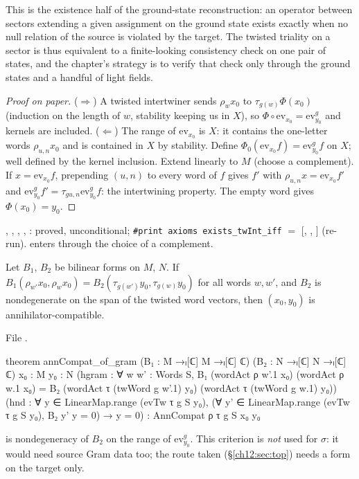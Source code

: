 \begin{physics}
This is the existence half of the ground-state reconstruction: an operator between sectors extending a given assignment on the ground state exists exactly when no null relation of the source is violated by the target. The twisted triality on a sector is thus equivalent to a finite-looking consistency check on one pair of states, and the chapter's strategy is to verify that check only through the ground states and a handful of light fields.
\end{physics}
\begin{proof}[Proof on paper]
($\Rightarrow$) A twisted intertwiner sends $\rho_wx_0$ to $\tau_{g(w)}\Phi(x_0)$ (induction on the length of
$w$, stability keeping us in $X$), so $\Phi\circ\mathrm{ev}_{x_0}=\mathrm{ev}^g_{y_0}$ and kernels are included.
($\Leftarrow$) The range of $\mathrm{ev}_{x_0}$ is $X$: it contains the one-letter words $\rho_{u,n}x_0$ and is
contained in $X$ by stability.  Define $\Phi_0(\mathrm{ev}_{x_0}f)=\mathrm{ev}^g_{y_0}f$ on $X$; well defined
by the kernel inclusion.  Extend linearly to $M$ (choose a complement).  If $x=\mathrm{ev}_{x_0}f$, prepending
$(u,n)$ to every word of $f$ gives $f'$ with $\rho_{u,n}x=\mathrm{ev}_{x_0}f'$ and
$\mathrm{ev}^g_{y_0}f'=\tau_{gu,n}\mathrm{ev}^g_{y_0}f$: the intertwining property.  The empty word gives
$\Phi(x_0)=y_0$.
\end{proof}
\begin{status}
, , , , :
proved, unconditional; \texttt{\#print axioms exists\_twInt\_iff} $=$ [,
, ] (re-run).   enters through the
choice of a complement.
\end{status}

\begin{theorem}\label{ch12:thm:gram}
Let $B_1$, $B_2$ be bilinear forms on $M$, $N$.  If
$B_1(\rho_{w'}x_0,\rho_wx_0)=B_2(\tau_{g(w')}y_0,\tau_{g(w)}y_0)$ for all words $w,w'$, and $B_2$ is
nondegenerate on the span of the twisted word vectors, then $(x_0,y_0)$ is annihilator-compatible.
\end{theorem}
File .
\begin{leancode}
theorem annCompat_of_gram (B₁ : M →ₗ[ℂ] M →ₗ[ℂ] ℂ) (B₂ : N →ₗ[ℂ] N →ₗ[ℂ] ℂ) {x₀ : M} {y₀ : N}
    (hgram : ∀ w w' : Words S, B₁ (wordAct ρ w'.1 x₀) (wordAct ρ w.1 x₀)
      = B₂ (wordAct τ (twWord g w'.1) y₀) (wordAct τ (twWord g w.1) y₀))
    (hnd : ∀ y ∈ LinearMap.range (evTw τ g S y₀),
      (∀ y' ∈ LinearMap.range (evTw τ g S y₀), B₂ y' y = 0) → y = 0) :
    AnnCompat ρ τ g S x₀ y₀
\end{leancode}
\begin{dictionary}
 is nondegeneracy of $B_2$ on the range of $\mathrm{ev}^g_{y_0}$.  This criterion is \emph{not}
used for $\sigma$: it would need source Gram data too; the route taken (\S\ref{ch12:sec:top}) needs a form
on the target only.
\end{dictionary}

